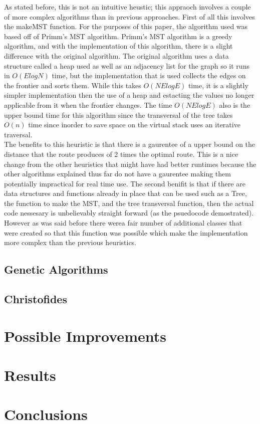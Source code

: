 \documentclass[midd]{thesis}
\newcommand{\tab}{\hspace*{2em}}
\begin{document}
\tab As stated before, this is not an intuitive heustic; this appraoch involves a couple of more complex algorithms than in previous approaches. First of all this involves the makeMST function. For the purposes of this paper, the algorithm used was based off of Primm's MST algorithm. Primm's MST algorithm is a greedy algorithm, and with the implementation of this algorithm, there is a slight difference with the original algorithm. The original algorithm uses a data structure called a heap used as well as an adjacency list for the graph so it runs in $O(ElogN)$ time, but the implementation that is used collects the edges on the frontier and sorts them. While this takes $O(NElogE)$ time, it is a slightly simpler implementation then the use of a heap and estacting the values no longer applicable from it when the frontier changes. The time $O(NElogE)$ also is the upper bound time for this algorithm since the transversal of the tree takes $O(n)$ time since inorder to save space on the virtual stack uses an iterative traversal.\\
\tab The benefits to this heuristic is that there is a gaurentee of a upper bound on the distance that the route produces of 2 times the optimal route. This is a nice change from the other heuristics that might have had better runtimes because the other algorithms explained thus far do not have a gaurentee making them potentially impractical for real time use. The second benifit is that if there are data structures and functions already in place that can be used such as a Tree, the function to make the MST, and the tree transversal function, then the actual code nessesary is unbelievably straight forward (as the psuedocode demostrated). However as was said before there werea fair number of additional classes that were created so that this function was possible which make the implementation more complex than the previous heuristics.

\section{Genetic Algorithms}

\section{Christofides}

\chapter{Possible Improvements}
\chapter{Results}
\chapter{Conclusions}


\end{document}
